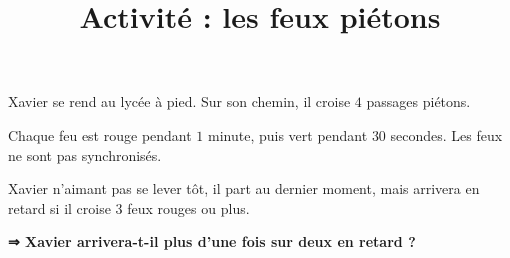 \documentclass[
	classe=$1^{ere}STI2D$,
	grayscale
]{informatique}
\title{Activité : les feux piétons}
\begin{document}
\maketitle
{}

\begin{tcolorbox}
	Xavier se rend au lycée à pied. Sur son chemin, il croise $4$ passages piétons.

	Chaque feu est rouge pendant $1$ minute, puis vert pendant $30$ secondes. Les feux ne sont pas synchronisés.

	Xavier n'aimant pas se lever tôt, il part au dernier moment, mais arrivera en retard si il croise $3$ feux rouges ou plus.

	\textbf{⇒ Xavier arrivera-t-il plus d'une fois sur deux en retard ?}
\end{tcolorbox}
\end{document}
